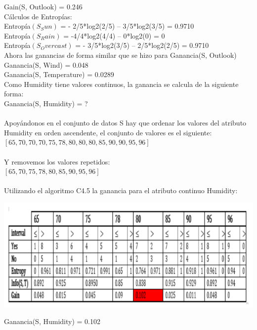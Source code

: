 \documentclass{article}
\begin{document}
			Gain(S, Outlook) = 0.246\\
			
Cálculos de Entropías:\\
Entropía$(S_Sun)$ = - 2/5*log2(2/5) – 3/5*log2(3/5) = 0.9710\\
Entropía$(S_Rain)$ = -4/4*log2(4/4) – 0*log2(0) = 0\\
Entropía$(S_Overcast)$ = - 3/5*log2(3/5) – 2/5*log2(2/5) = 0.9710\\

Ahora las ganancias de forma similar que se hizo para Ganancia(S, Outlook)\\
Ganancia(S, Wind) = 0.048\\
Ganancia(S, Temperature) = 0.0289\\

Como Humidity tiene valores continuos, la ganancia se calcula de la siguiente forma:\\


Ganancia(S, Humidity) = ?\\\\
Apoyándonos en el conjunto de datos S  hay que ordenar los valores del atributo Humidity en orden ascendente, el conjunto de valores es el siguiente:\\
$[65, 70, 70, 70, 75, 78, 80, 80, 80, 85, 90, 90, 95, 96]$\\\\
Y removemos los valores repetidos:\\
$[65, 70, 75, 78, 80, 85, 90, 95, 96]$\\\\
Utilizando el algoritmo C4.5 la ganancia para el atributo continuo Humidity:\\
\begin{center}
 \includegraphics[scale=0.7]{c45}\\
\end{center}
Ganancia(S, Humidity) = 0.102\\
\end{document}
